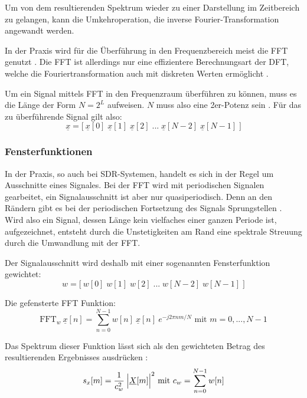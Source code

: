 Um von dem resultierenden Spektrum wieder zu einer Darstellung im Zeitbereich zu gelangen, kann die Umkehroperation, die inverse Fourier-Transformation angewandt werden.

In der Praxis wird für die Überführung in den Frequenzbereich meist die \ac{FFT} genutzt \cite[vgl. Heuberger, e. a., S. 14]{Heuberger:2017}. Die \ac{FFT} ist allerdings nur eine effizientere Berechnungsart der \ac{DFT}, welche die Fouriertransformation auch mit diskreten Werten ermöglicht \cite[vgl. Meyer, S. 175]{Meyer:2017}.

Um ein Signal mittels \ac{FFT} in den Frequenzraum überführen zu können, muss es die Länge der Form \(N = 2^L\) aufweisen. \(N\) muss also eine 2er-Potenz sein \cite[vgl. Heuberger, e. a., S. 15]{Heuberger:2017}.
Für das zu überführende Signal gilt also:
\[\underline{x} = \Big[ \:  \underline{x}[0] \; \underline{x}[1] \; \underline{x}[2] \; ... \; \underline{x}[N - 2] \; \underline{x}[N - 1] \; \Big] \]







\subsubsection{Fensterfunktionen}
In der Praxis, so auch bei \ac{SDR}-Systemen, handelt es sich in der Regel um Ausschnitte eines Signales. Bei der \ac{FFT} wird mit periodischen Signalen gearbeitet, ein Signalausschnitt ist aber nur quasiperiodisch. Denn an den Rändern gibt es bei der periodischen Fortsetzung des Signals Sprungstellen \cite[vgl. Meyer, S. 187]{Meyer:2017}.\newline
Wird also ein Signal, dessen Länge kein vielfaches einer ganzen Periode ist, aufgezeichnet, entsteht durch die Unstetigkeiten am Rand eine spektrale Streuung durch die Umwandlung mit der \ac{FFT}.

Der Signalausschnitt wird deshalb mit einer sogenannten Fensterfunktion gewichtet: 
\[w = \Big[ \:  w[0] \; w[1] \; w[2] \; ... \; w[N - 2] \; w[N - 1] \; \Big] \]


Die gefensterte FFT Funktion:
\[\text{FFT} _w \: {\underline{x}[n]} = \sum_{n=0}^{N-1} w[n] \: \underline{x}[n] \: e^{-j2\pi nm / N} \text{ mit } m = 0, ..., N-1\]


Das Spektrum dieser Funktion lässt sich als den gewichteten Betrag des resultierenden Ergebnisses ausdrücken \cite[vgl. Heuberger, e. a., S. 14]{Heuberger:2017}:
\[s_x[m] = \frac{1}{c_w^2} \: \Big{|}\underline{X}[m]  \Big{|}^2 \text{ mit } c_w = \sum_{n=0}^{N-1} w[n] \]

